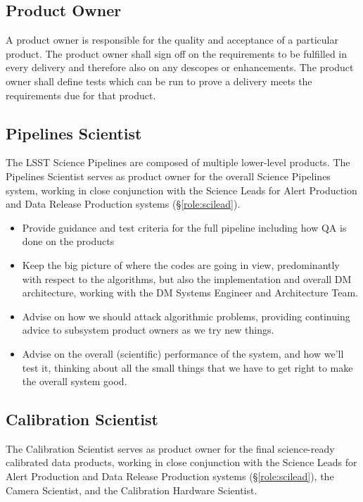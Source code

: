 \subsection{Product Owner \label{role:prodo}}

A product owner is responsible for the quality and acceptance of a particular product.
The product owner shall sign off on the requirements to be fulfilled in every delivery and therefore also on any descopes or enhancements.
The product owner shall define tests which can be run to prove a delivery meets the requirements due for that product.

\subsection{Pipelines Scientist \label{role:pipe}}

The LSST Science Pipelines are composed of multiple lower-level products.
The Pipelines Scientist serves as product owner for the overall Science Pipelines system, working in close conjunction with the Science Leads for Alert Production and Data Release Production systems (\S\ref{role:scilead}).

\begin{itemize}

\item Provide guidance and test criteria for the full pipeline including how QA is done on the products
\item Keep the big picture of where the codes are going in view, predominantly with respect to the algorithms, but also the implementation and overall DM architecture, working with the DM Systems Engineer and Architecture Team.
\item Advise on how we should attack algorithmic problems, providing continuing advice to subsystem product owners as we try new things.
\item Advise on the overall (scientific) performance of the system, and how we'll test it, thinking about all the small things that we have to get right to make the overall system good.

\end{itemize}

\subsection{Calibration Scientist \label{role:calsci}}

The Calibration Scientist serves as product owner for the final science-ready calibrated data products, working in close conjunction with the Science Leads for Alert Production and Data Release Production systems (\S\ref{role:scilead}), the Camera Scientist, and the Calibration Hardware Scientist.

